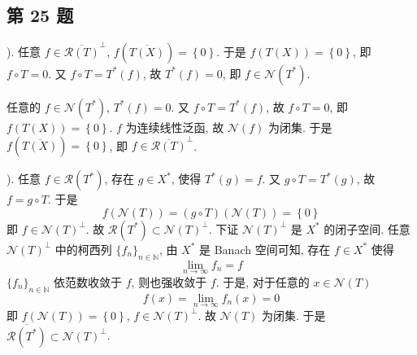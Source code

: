 \documentclass[\ROOT/main.tex]{subfiles}
\begin{document}
\subsection{第 25 题}
).
任意 $f \in \overline{\mathscr{R} \left( T \right)}^\bot$, $f \left( \overline{T \left( X \right)} \right) = \left\{ 0 \right\}$.
于是 $f \left( T \left( X \right) \right) = \left\{ 0 \right\}$, 即 $f \circ T = 0$.
又 $f \circ T = T^* \left( f \right)$, 故 $T^* \left( f \right) = 0$, 即 $f \in \mathscr{N} \left( T^* \right)$.

任意的 $f \in \mathscr{N} \left( T^* \right)$, $T^* \left( f \right) = 0$.
又 $f \circ T = T^* \left( f \right)$, 故 $f \circ T = 0$, 即 $f \left( T \left( X \right) \right) = \left\{ 0 \right\}$.
$f$ 为连续线性泛函, 故 $\mathscr{N} \left( f \right)$ 为闭集.
于是 $f \left( \overline{T \left( X \right)} \right) = \left\{ 0 \right\}$, 即 $f \in \overline{\mathscr{R} \left( T \right)}^\bot$.

).
任意 $f \in \mathscr{R} \left( T^* \right)$, 存在 $g \in X^*$, 使得 $T^* \left( g \right) = f$.
又 $g \circ T = T^* \left( g \right)$, 故 $f = g \circ T$.
于是
\[
    f \left( \mathscr{N} \left( T \right) \right)
    = \left( g \circ T \right) \left( \mathscr{N} \left( T \right) \right)
    = \left\{ 0 \right\}
\]
即 $f \in \mathscr{N} \left( T \right)^\bot$.
故 $\mathscr{R} \left( T^* \right) \subset \mathscr{N} \left( T \right)^\bot$.
下证 $\mathscr{N} \left( T \right)^\bot$ 是 $X^*$ 的闭子空间.
任意 $\mathscr{N} \left( T \right)^\bot$ 中的柯西列 $\{ f_{n} \}_{n \in \mathbb{N}}$, 由 $X^*$ 是 Banach 空间可知, 存在 $f \in X^*$ 使得
\[
    \lim_{n \to \infty} f_n = f
\]
$\{ f_{n} \}_{n \in \mathbb{N}}$ 依范数收敛于 $f$, 则也强收敛于 $f$.
于是, 对于任意的 $x \in \mathscr{N} \left( T \right)$
\[
    f \left( x \right) = \lim_{n \to \infty} f_n \left( x \right) = 0
\]
即 $f \left( \mathscr{N} \left( T \right) \right) = \left\{ 0 \right\}$, $f \in \mathscr{N} \left( T \right)^\bot$.
故 $\mathscr{N} \left( T \right)$ 为闭集.
于是 $\overline{\mathscr{R} \left( T^* \right)} \subset \mathscr{N} \left( T \right)^\bot$.
\end{document}
